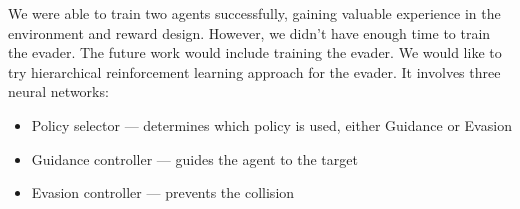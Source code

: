 
We were able to train two agents successfully, gaining valuable experience in the environment and reward design.
However, we didn't have enough time to train the evader.
The future work would include training the evader.
We would like to try hierarchical reinforcement learning approach for the evader.
It involves three neural networks:
\begin{itemize}
	\item Policy selector — determines which policy is used, either Guidance or Evasion
	\item Guidance controller — guides the agent to the target
	\item Evasion controller — prevents the collision
\end{itemize}
